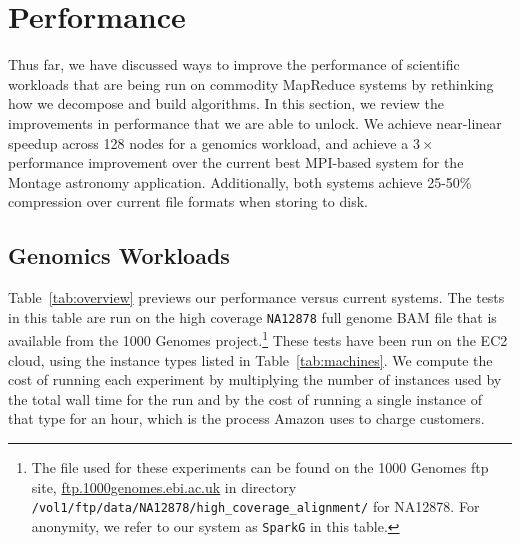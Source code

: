 \documentclass[10pt]{report} %
\begin{document}
\section{Performance}
\label{sec:performance}

Thus far, we have discussed ways to improve the performance of scientific workloads that are
being run on commodity MapReduce systems by rethinking how we decompose and build algorithms.
In this section, we review the improvements in performance that we are able to unlock. We achieve
near-linear speedup across 128 nodes for a genomics workload, and achieve a $3\times$ performance
improvement over the current best MPI-based system for the Montage astronomy application.
Additionally, both systems achieve 25-50\% compression over current file formats when storing to disk.

\subsection{Genomics Workloads}
\label{sec:genomics-performance}

Table~\ref{tab:overview} previews our performance versus current systems. The tests in this table are run on the
high coverage \texttt{NA12878} full genome BAM file that is available from the 1000 Genomes
project.\footnote{The file used for these experiments can be found on the
1000 Genomes ftp site, \url{ftp.1000genomes.ebi.ac.uk} in directory 
\texttt{/vol1/ftp/data/NA12878/high\_coverage\_alignment/} for NA12878. For anonymity, we refer to our system
as \texttt{SparkG} in this table.} These tests have been run on the EC2 cloud, using the instance types listed in
Table~\ref{tab:machines}. We compute the cost of running each experiment by multiplying the number of instances
used by the total wall time for the run and by the cost of running a single instance of that type for an hour, which is
the process Amazon uses to charge customers.
\end{document}
